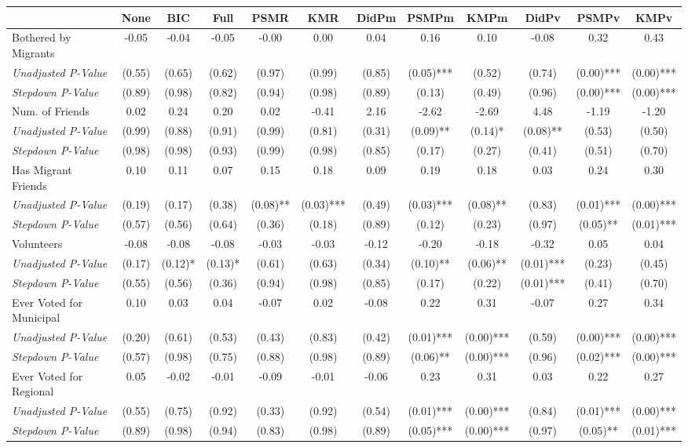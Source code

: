\begin{tabular}{l c c c c c c c c c c c}
\toprule
 & None & BIC & Full & PSMR & KMR & DidPm & PSMPm & KMPm & DidPv & PSMPv & KMPv \\
\midrule
Bothered by Migrants & -0.05 & -0.04 & -0.05 & -0.00 & 0.00 & 0.04 & 0.16 & 0.10 & -0.08 & 0.32 & 0.43 \\
\quad \textit{Unadjusted P-Value} & (0.55) & (0.65) & (0.62) & (0.97) & (0.99) & (0.85) & (0.05)*** & (0.52) & (0.74) & (0.00)*** & (0.00)*** \\
\quad \textit{Stepdown P-Value} & (0.89) & (0.98) & (0.82) & (0.94) & (0.98) & (0.89) & (0.13) & (0.49) & (0.96) & (0.00)*** & (0.00)*** \\
Num. of Friends & 0.02 & 0.24 & 0.20 & 0.02 & -0.41 & 2.16 & -2.62 & -2.69 & 4.48 & -1.19 & -1.20 \\
\quad \textit{Unadjusted P-Value} & (0.99) & (0.88) & (0.91) & (0.99) & (0.81) & (0.31) & (0.09)** & (0.14)* & (0.08)** & (0.53) & (0.50) \\
\quad \textit{Stepdown P-Value} & (0.98) & (0.98) & (0.93) & (0.99) & (0.98) & (0.85) & (0.17) & (0.27) & (0.41) & (0.51) & (0.70) \\
Has Migrant Friends & 0.10 & 0.11 & 0.07 & 0.15 & 0.18 & 0.09 & 0.19 & 0.18 & 0.03 & 0.24 & 0.30 \\
\quad \textit{Unadjusted P-Value} & (0.19) & (0.17) & (0.38) & (0.08)** & (0.03)*** & (0.49) & (0.03)*** & (0.08)** & (0.83) & (0.01)*** & (0.00)*** \\
\quad \textit{Stepdown P-Value} & (0.57) & (0.56) & (0.64) & (0.36) & (0.18) & (0.89) & (0.12) & (0.23) & (0.97) & (0.05)** & (0.01)*** \\
Volunteers & -0.08 & -0.08 & -0.08 & -0.03 & -0.03 & -0.12 & -0.20 & -0.18 & -0.32 & 0.05 & 0.04 \\
\quad \textit{Unadjusted P-Value} & (0.17) & (0.12)* & (0.13)* & (0.61) & (0.63) & (0.34) & (0.10)** & (0.06)** & (0.01)*** & (0.23) & (0.45) \\
\quad \textit{Stepdown P-Value} & (0.55) & (0.56) & (0.36) & (0.94) & (0.98) & (0.85) & (0.17) & (0.22) & (0.01)*** & (0.41) & (0.70) \\
Ever Voted for Municipal & 0.10 & 0.03 & 0.04 & -0.07 & 0.02 & -0.08 & 0.22 & 0.31 & -0.07 & 0.27 & 0.34 \\
\quad \textit{Unadjusted P-Value} & (0.20) & (0.61) & (0.53) & (0.43) & (0.83) & (0.42) & (0.01)*** & (0.00)*** & (0.59) & (0.00)*** & (0.00)*** \\
\quad \textit{Stepdown P-Value} & (0.57) & (0.98) & (0.75) & (0.88) & (0.98) & (0.89) & (0.06)** & (0.00)*** & (0.96) & (0.02)*** & (0.00)*** \\
Ever Voted for Regional & 0.05 & -0.02 & -0.01 & -0.09 & -0.01 & -0.06 & 0.23 & 0.31 & 0.03 & 0.22 & 0.27 \\
\quad \textit{Unadjusted P-Value} & (0.55) & (0.75) & (0.92) & (0.33) & (0.92) & (0.54) & (0.01)*** & (0.00)*** & (0.84) & (0.01)*** & (0.00)*** \\
\quad \textit{Stepdown P-Value} & (0.89) & (0.98) & (0.94) & (0.83) & (0.98) & (0.89) & (0.05)*** & (0.00)*** & (0.97) & (0.05)** & (0.01)*** \\
\bottomrule
\end{tabular}
